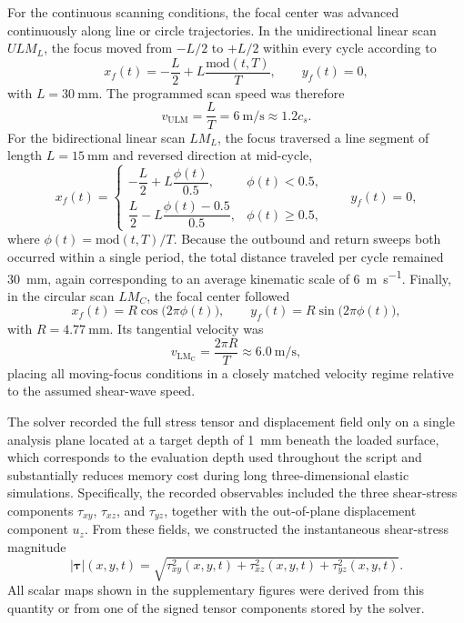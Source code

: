 \documentclass[pdflatex, sn-nature]{sn-jnl}
\theoremstyle{thmstyleone}%
\theoremstyle{thmstyletwo}%
\theoremstyle{thmstylethree}%
\begin{document}
For the continuous scanning conditions, the focal center was advanced continuously along line or circle trajectories. In the unidirectional linear scan $ULM_L$, the focus moved from $-L/2$ to $+L/2$ within every cycle according to
\begin{equation}
    x_f(t) = -\frac{L}{2}+L\frac{\mathrm{mod}(t,T)}{T},
    \qquad
    y_f(t)=0,
\end{equation}
with $L=\qty{30}{\milli\meter}$. The programmed scan speed was therefore
\begin{equation}
    v_{\mathrm{ULM}} = \frac{L}{T} = \qty{6}{\meter\per\second} \approx 1.2 c_s.
\end{equation}
For the bidirectional linear scan $LM_L$, the focus traversed a line segment of length $L=\qty{15}{\milli\meter}$ and reversed direction at mid-cycle,
\begin{equation}
    x_f(t)=
    \begin{cases}
        -\dfrac{L}{2}+L\dfrac{\phi(t)}{0.5},    & \phi(t)<0.5,    \\[6pt]
        \dfrac{L}{2}-L\dfrac{\phi(t)-0.5}{0.5}, & \phi(t)\ge 0.5,
    \end{cases}
    \qquad
    y_f(t)=0,
\end{equation}
where $\phi(t)=\mathrm{mod}(t,T)/T$. Because the outbound and return sweeps both occurred within a single period, the total distance traveled per cycle remained \qty{30}{\milli\meter}, again corresponding to an average kinematic scale of \qty{6}{\meter\per\second}. Finally, in the circular scan $LM_C$, the focal center followed
\begin{equation}
    x_f(t)=R\cos\bigl(2\pi\phi(t)\bigr),
    \qquad
    y_f(t)=R\sin\bigl(2\pi\phi(t)\bigr),
\end{equation}
with $R=\qty{4.77}{\milli\meter}$. Its tangential velocity was
\begin{equation}
    v_{\mathrm{LM_C}}=\frac{2\pi R}{T}\approx \qty{6.0}{\meter\per\second},
\end{equation}
placing all moving-focus conditions in a closely matched velocity regime relative to the assumed shear-wave speed.

The solver recorded the full stress tensor and displacement field only on a single analysis plane located at a target depth of \qty{1}{\milli\meter} beneath the loaded surface, which corresponds to the evaluation depth used throughout the script and substantially reduces memory cost during long three-dimensional elastic simulations. Specifically, the recorded observables included the three shear-stress components $\tau_{xy}$, $\tau_{xz}$, and $\tau_{yz}$, together with the out-of-plane displacement component $u_z$. From these fields, we constructed the instantaneous shear-stress magnitude
\begin{equation}
    |\boldsymbol{\tau}|(x,y,t)=\sqrt{\tau_{xy}^2(x,y,t)+\tau_{xz}^2(x,y,t)+\tau_{yz}^2(x,y,t)}.
\end{equation}
All scalar maps shown in the supplementary figures were derived from this quantity or from one of the signed tensor components stored by the solver.
\end{document}
